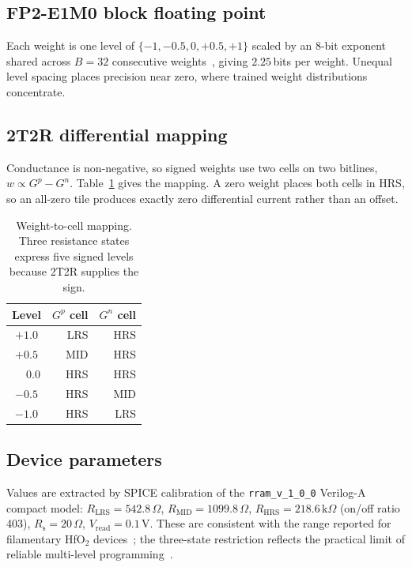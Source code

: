 \documentclass[conference,10pt]{IEEEtran}
\newcommand{\Rs}{R_{\mathrm{s}}}
\begin{document}
\subsection{FP2-E1M0 block floating point}

Each weight is one level of $\{-1,-0.5,0,+0.5,+1\}$ scaled by an 8-bit
exponent shared across $B{=}32$ consecutive weights~\cite{fp2}, giving
$2.25$\,bits per
weight. Unequal level spacing places precision near zero, where trained weight
distributions concentrate.

\subsection{2T2R differential mapping}

Conductance is non-negative, so signed weights use two cells on two bitlines,
$w \propto G^{p}-G^{n}$. Table~\ref{tab:map} gives the mapping. A zero weight
places both cells in HRS, so an all-zero tile produces exactly zero differential
current rather than an offset.

\begin{table}[t]
\centering
\caption{Weight-to-cell mapping. Three resistance states express five signed
levels because 2T2R supplies the sign.}
\label{tab:map}
\begin{tabular}{crr}
\toprule
Level & $G^{p}$ cell & $G^{n}$ cell \\
\midrule
$+1.0$ & LRS & HRS \\
$+0.5$ & MID & HRS \\
$\phantom{+}0.0$ & HRS & HRS \\
$-0.5$ & HRS & MID \\
$-1.0$ & HRS & LRS \\
\bottomrule
\end{tabular}
\end{table}

\subsection{Device parameters}

Values are extracted by SPICE calibration of the \texttt{rram\_v\_1\_0\_0}
Verilog-A compact model:
$R_{\mathrm{LRS}}{=}542.8\,\Omega$,
$R_{\mathrm{MID}}{=}1099.8\,\Omega$,
$R_{\mathrm{HRS}}{=}218.6\,\mathrm{k}\Omega$ (on/off ratio 403),
$\Rs{=}20\,\Omega$, $V_{\mathrm{read}}{=}0.1$\,V. These are consistent with
the range reported for filamentary HfO$_2$ devices~\cite{zahoor2020}; the
three-state restriction reflects the practical limit of reliable multi-level
programming~\cite{perez2021}.
\end{document}
